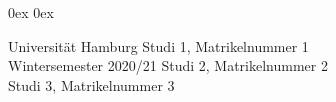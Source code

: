 \usepackage{amsmath,amssymb,amsthm,amsfonts}
\usepackage[utf8]{inputenc}
\usepackage{algorithmic,algorithm}
\usepackage{graphics,graphicx}
\usepackage{pgfplots,tikz}
\usepackage{enumerate}
\usepackage[ngerman]{babel}
\usepackage{eurosym}
\usepackage{hyperref}
\usepackage{caption, subcaption}

\renewcommand{\algorithmicrequire}{\textbf{Input:}}
\renewcommand{\algorithmicensure}{\textbf{Output:}}

\topmargin-15mm
\oddsidemargin-5mm    %
\textwidth17cm    %
\thispagestyle{empty}
\parindent0mm
\parskip0ex
\parskip0ex

\makeatletter
\DeclareOldFontCommand{\rm}{\normalfont\rmfamily}{\mathrm}
\DeclareOldFontCommand{\sf}{\normalfont\sffamily}{\mathsf}
\DeclareOldFontCommand{\tt}{\normalfont\ttfamily}{\mathtt}
\DeclareOldFontCommand{\bf}{\normalfont\bfseries}{\mathbf}
\DeclareOldFontCommand{\it}{\normalfont\itshape}{\mathit}
\DeclareOldFontCommand{\sl}{\normalfont\slshape}{\@nomath\sl}
\DeclareOldFontCommand{\sc}{\normalfont\scshape}{\@nomath\sc}
\makeatother

\newcommand{\Aufgabe}[2][]{\par\bigskip{\sf\bfseries Aufgabe #2#1:}}


{\sf Universität Hamburg \hfill Studi 1, Matrikelnummer 1 \\ Wintersemester 2020/21 \hfill Studi 2, Matrikelnummer 2 \\ \phantom{x} \hfill Studi 3, Matrikelnummer 3}
\begin{center}
\end{center}

\renewcommand{\tilde}{\widetilde}
\renewcommand{\hat}{\widehat}
\newcommand{\ri}{\mathrm{i}}
\renewcommand{\H}{\mathsf{H}}
\newcommand{\T}{\mathsf{T}}
